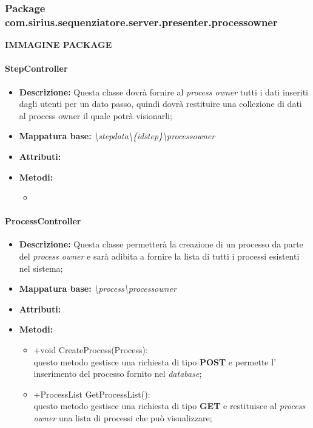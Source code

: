 \subsubsection{Package com.sirius.sequenziatore.server.presenter.processowner}
\textbf{IMMAGINE PACKAGE}
\paragraph{StepController}%
\begin{itemize}
	\item \textbf{Descrizione: } Questa classe dovrà fornire al \textit{process owner} tutti i dati inseriti dagli utenti per un dato passo, quindi dovrà restituire una collezione di dati al process owner il quale potrà visionarli;
	\item \textbf{Mappatura base: } \textit{\textbackslash stepdata\textbackslash \{idstep\}\textbackslash processowner}
	\item \textbf{Attributi: }
	\item \textbf{Metodi: }\begin{itemize}
					\item 
				\end{itemize}
\end{itemize}
\paragraph{ProcessController}%
\begin{itemize}
	\item \textbf{Descrizione: } Questa classe permetterà la creazione di un processo da parte del \textit{process owner} e sarà adibita a fornire la lista di tutti i processi esistenti nel sistema;
	\item \textbf{Mappatura base: } \textit{\textbackslash process\textbackslash processowner}
	\item \textbf{Attributi: }
	\item \textbf{Metodi: }
				\begin{itemize}
					\item +void CreateProcess(Process):\\
					questo metodo gestisce una richiesta di tipo \textbf{POST} e permette l' inserimento del processo fornito nel \textit{database};
					\item +ProcessList GetProcessList():\\
					 questo metodo gestisce una richiesta di tipo \textbf{GET} e restituisce al \textit{process owner} una lista di processi che può visualizzare;
				\end{itemize}
\end{itemize}
